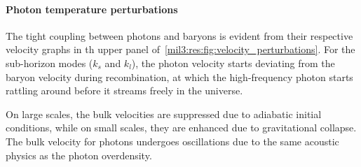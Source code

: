 





\paragraph{Photon temperature perturbations}
The tight coupling between photons and baryons is evident from their respective velocity graphs in th upper panel of~\cref{mil3:res:fig:velocity_perturbations}. For the sub-horizon modes ($k_s$ and $k_l$), the photon velocity starts deviating from the baryon velocity during recombination, at which the high-frequency photon starts rattling around before it streams freely in the universe.

On large scales, the bulk velocities are suppressed due to adiabatic initial conditions, while on small scales, they are enhanced due to gravitational collapse. The bulk velocity for photons undergoes oscillations due to the same acoustic physics as the photon overdensity.

